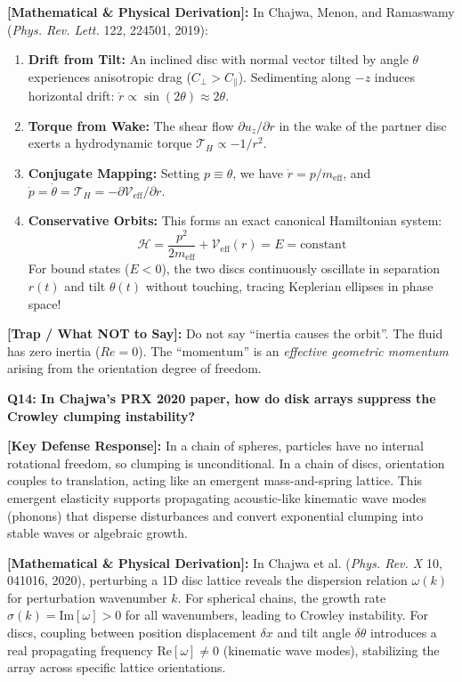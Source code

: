 \documentclass[11pt,a4paper]{article}
\newcommand{\question}[2]{
    \vspace{0.4cm}
    \noindent\colorbox{blue!10}{\parbox{\dimexpr\textwidth-2\fboxsep\relax}{
        \textbf{#1: #2}
    }}
    \vspace{0.2cm}
}
\newcommand{\shortanswer}[1]{
    \noindent\textbf{\textcolor{green!50!black}{[Key Defense Response]:}} #1
    \vspace{0.2cm}
}
\newcommand{\deepdetails}[1]{
    \noindent\textbf{\textcolor{blue!60!black}{[Mathematical \& Physical Derivation]:}} #1
    \vspace{0.2cm}
}
\newcommand{\pitfall}[1]{
    \noindent\textbf{\textcolor{red!70!black}{[Trap / What NOT to Say]:}} #1
    \vspace{0.3cm}
}
\begin{document}
\deepdetails{
In Chajwa, Menon, and Ramaswamy (\emph{Phys. Rev. Lett.} 122, 224501, 2019):
\begin{enumerate}
    \item \textbf{Drift from Tilt:} An inclined disc with normal vector tilted by angle $\theta$ experiences anisotropic drag ($C_\perp > C_\parallel$). Sedimenting along $-z$ induces horizontal drift: $\dot{r} \propto \sin(2\theta) \approx 2\theta$.
    \item \textbf{Torque from Wake:} The shear flow $\partial u_z / \partial r$ in the wake of the partner disc exerts a hydrodynamic torque $\mathcal{T}_H \propto -1/r^2$.
    \item \textbf{Conjugate Mapping:} Setting $p \equiv \theta$, we have $\dot{r} = p / m_{\text{eff}}$, and $\dot{p} = \dot{\theta} = \mathcal{T}_H = -\partial \mathcal{V}_{\text{eff}} / \partial r$.
    \item \textbf{Conservative Orbits:} This forms an exact canonical Hamiltonian system:
    \begin{equation}
        \mathcal{H} = \frac{p^2}{2 m_{\text{eff}}} + \mathcal{V}_{\text{eff}}(r) = E = \text{constant}
    \end{equation}
    For bound states ($E < 0$), the two discs continuously oscillate in separation $r(t)$ and tilt $\theta(t)$ without touching, tracing Keplerian ellipses in phase space!
\end{enumerate}
}

\pitfall{Do not say ``inertia causes the orbit''. The fluid has zero inertia ($Re = 0$). The ``momentum'' is an \emph{effective geometric momentum} arising from the orientation degree of freedom.}

\vspace{0.4cm}
\question{Q14}{In Chajwa's PRX 2020 paper, how do disk arrays suppress the Crowley clumping instability?}

\shortanswer{In a chain of spheres, particles have no internal rotational freedom, so clumping is unconditional. In a chain of discs, orientation couples to translation, acting like an emergent mass-and-spring lattice. This emergent elasticity supports propagating acoustic-like kinematic wave modes (phonons) that disperse disturbances and convert exponential clumping into stable waves or algebraic growth.}

\deepdetails{
In Chajwa et al. (\emph{Phys. Rev. X} 10, 041016, 2020), perturbing a 1D disc lattice reveals the dispersion relation $\omega(k)$ for perturbation wavenumber $k$. For spherical chains, the growth rate $\sigma(k) = \text{Im}[\omega] > 0$ for all wavenumbers, leading to Crowley instability. For discs, coupling between position displacement $\delta x$ and tilt angle $\delta \theta$ introduces a real propagating frequency $\text{Re}[\omega] \ne 0$ (kinematic wave modes), stabilizing the array across specific lattice orientations.
}
\end{document}
